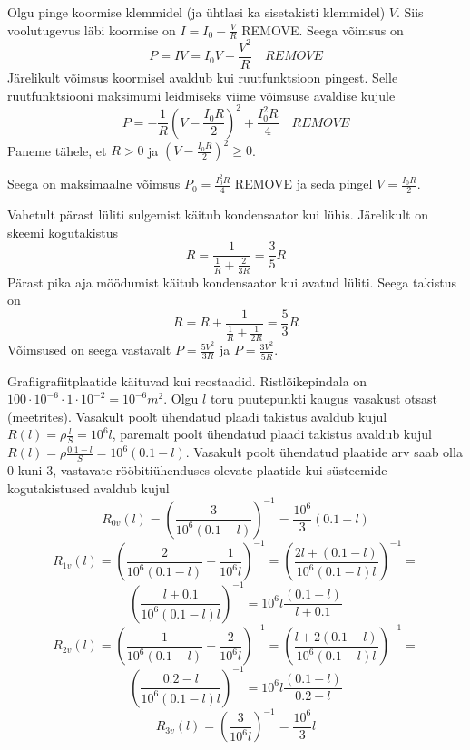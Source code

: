 \documentclass[10pt]{article}
\newcommand{\pp}[1]{REMOVE}
\begin{document}

\solu
Olgu pinge koormise klemmidel (ja ühtlasi ka sisetakisti klemmidel) $V$.
Siis voolutugevus läbi koormise on $I = I_0 - \frac VR$ \pp2. Seega võimsus on
$$P = IV = I_0V - \frac{V^2}R \quad \pp3$$
Järelikult võimsus koormisel avaldub kui ruutfunktsioon pingest. Selle ruutfunktsiooni maksimumi leidmiseks viime võimsuse avaldise kujule
$$P=-\frac1R \left(V - \frac{I_0R}2\right)^2 + \frac{I_0^2R}4 \quad \pp2$$
Paneme tähele, et $R>0$ ja $(V - \frac{I_0R}{2})^2 \ge 0$. \par
Seega on maksimaalne võimsus $P_0 = \frac{I_0^2R}{4}$ \pp1 ja seda pingel $V = \frac{I_0R}{2}$.
\probend
\bigskip


\solu
Vahetult pärast lüliti sulgemist käitub kondensaator kui lühis. Järelikult on skeemi kogutakistus
\[
  R=\frac{1}{\frac 1R + \frac 2{3R}}=\frac 35 R
\]
Pärast pika aja möödumist käitub kondensaator kui avatud lüliti. Seega takistus on
\[
  R=R+\frac{1}{\frac 1R + \frac 1{2R}}=\frac 53 R
\]
Võimsused on seega vastavalt $P=\frac{5V^2}{3R}$ ja $P=\frac{3V^2}{5R}$.
\probend
\bigskip


\solu
Grafiigrafiitplaatide käituvad kui reostaadid.
Ristlõikepindala on $100 \cdot 10^{-6} \cdot 1 \cdot 10^{-2} = 10^{-6} \si{m^2}$.
Olgu $l$ toru puutepunkti kaugus vasakust otsast (meetrites).
Vasakult poolt ühendatud plaadi takistus avaldub kujul $R(l)=\rho \frac{l}{S} = 10^6 l $, paremalt poolt ühendatud plaadi takistus avaldub kujul $R(l)= \rho \frac{0.1 - l}{S} = 10^6 (0.1-l) $.
Vasakult poolt ühendatud plaatide arv saab olla 0 kuni 3, vastavate rööbitiühenduses olevate plaatide kui süsteemide kogutakistused avaldub kujul
\[ R_{0v}(l) = \left(\frac{3}{10^6 (0.1-l)} \right)^{-1} =  \frac{10^6}{3} (0.1-l) \]
\[ R_{1v}(l) = \left(\frac{2}{10^6 (0.1-l) } + \frac{1}{10^6 l } \right)^{-1} =  
\left(\frac{2l +(0.1-l)}{10^6 (0.1-l)l }\right)^{-1} = \]
\[ \left(\frac{l +0.1}{10^6 (0.1-l)l }\right)^{-1} =10^6 l\frac{(0.1-l)}{l+0.1} \]
\[ R_{2v}(l) = \left(\frac{1}{10^6 (0.1-l) } + \frac{2}{10^6 l } \right)^{-1} =  
\left(\frac{l +2(0.1-l)}{10^6 (0.1-l)l }\right)^{-1} = \]
\[ \left(\frac{0.2-l}{10^6 (0.1-l)l }\right)^{-1} =10^6 l \frac{(0.1-l)}{0.2-l} \]
\[ R_{3v}(l) = \left(\frac{3}{10^6 l} \right)^{-1} =  \frac{10^6}{3}l\]
\end{document}
